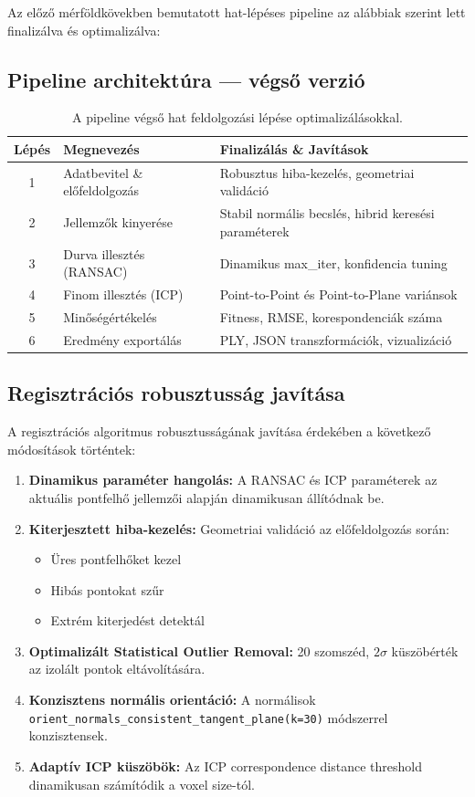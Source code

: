 \documentclass[12pt,a4paper]{article}
\begin{document}
Az előző mérföldkövekben bemutatott hat-lépéses pipeline az alábbiak szerint lett finalizálva és optimalizálva:

\subsection{Pipeline architektúra — végső verzió}

\begin{table}[H]
\centering
\begin{tabular}{clp{8cm}}
\toprule
\textbf{Lépés} & \textbf{Megnevezés} & \textbf{Finalizálás \& Javítások} \\
\midrule
1 & Adatbevitel \& előfeldolgozás & Robusztus hiba-kezelés, geometriai validáció \\
2 & Jellemzők kinyerése & Stabil normális becslés, hibrid keresési paraméterek \\
3 & Durva illesztés (RANSAC) & Dinamikus max\_iter, konfidencia tuning \\
4 & Finom illesztés (ICP) & Point-to-Point és Point-to-Plane variánsok \\
5 & Minőségértékelés & Fitness, RMSE, korespondenciák száma \\
6 & Eredmény exportálás & PLY, JSON transzformációk, vizualizáció \\
\bottomrule
\end{tabular}
\caption{A pipeline végső hat feldolgozási lépése optimalizálásokkal.}
\end{table}

\subsection{Regisztrációs robusztusság javítása}

A regisztrációs algoritmus robusztusságának javítása érdekében a következő módosítások történtek:

\begin{enumerate}[nosep]
    \item \textbf{Dinamikus paraméter hangolás:} A RANSAC és ICP paraméterek az aktuális pontfelhő jellemzői alapján dinamikusan állítódnak be.
    \item \textbf{Kiterjesztett hiba-kezelés:} Geometriai validáció az előfeldolgozás során:
        \begin{itemize}
            \item Üres pontfelhőket kezel
            \item Hibás pontokat szűr
            \item Extrém kiterjedést detektál
        \end{itemize}
    \item \textbf{Optimalizált Statistical Outlier Removal:} 20 szomszéd, $2\sigma$ küszöbérték az izolált pontok eltávolítására.
    \item \textbf{Konzisztens normális orientáció:} A normálisok \texttt{orient\_normals\_consistent\_tangent\_plane(k=30)} módszerrel konzisztensek.
    \item \textbf{Adaptív ICP küszöbök:} Az ICP correspondence distance threshold dinamikusan számítódik a voxel size-tól.
\end{enumerate}
\end{document}
